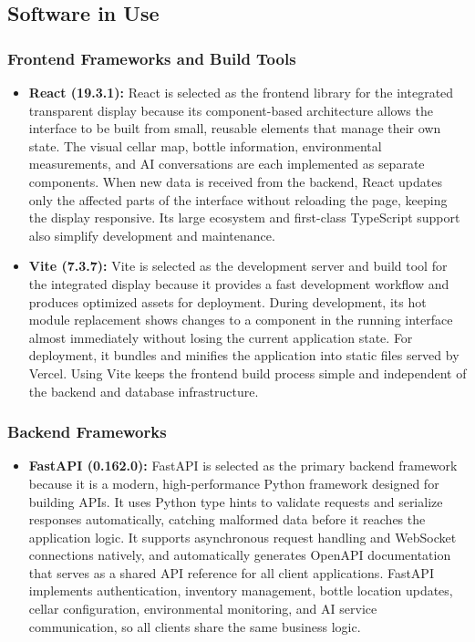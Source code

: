 \documentclass[conference]{IEEEtran}
\begin{document}
\subsection{Software in Use}

\subsubsection{Frontend Frameworks and Build Tools}
\begin{itemize}
    \item \textbf{React (19.3.1):} React is selected as the frontend library for the integrated transparent display because its component-based architecture allows the interface to be built from small, reusable elements that manage their own state. The visual cellar map, bottle information, environmental measurements, and AI conversations are each implemented as separate components. When new data is received from the backend, React updates only the affected parts of the interface without reloading the page, keeping the display responsive. Its large ecosystem and first-class TypeScript support also simplify development and maintenance.
    \item \textbf{Vite (7.3.7):} Vite is selected as the development server and build tool for the integrated display because it provides a fast development workflow and produces optimized assets for deployment. During development, its hot module replacement shows changes to a component in the running interface almost immediately without losing the current application state. For deployment, it bundles and minifies the application into static files served by Vercel. Using Vite keeps the frontend build process simple and independent of the backend and database infrastructure.
\end{itemize}

\subsubsection{Backend Frameworks}
\begin{itemize}
    \item \textbf{FastAPI (0.162.0):} FastAPI is selected as the primary backend framework because it is a modern, high-performance Python framework designed for building APIs. It uses Python type hints to validate requests and serialize responses automatically, catching malformed data before it reaches the application logic. It supports asynchronous request handling and WebSocket connections natively, and automatically generates OpenAPI documentation that serves as a shared API reference for all client applications. FastAPI implements authentication, inventory management, bottle location updates, cellar configuration, environmental monitoring, and AI service communication, so all clients share the same business logic.
\end{itemize}
\end{document}
